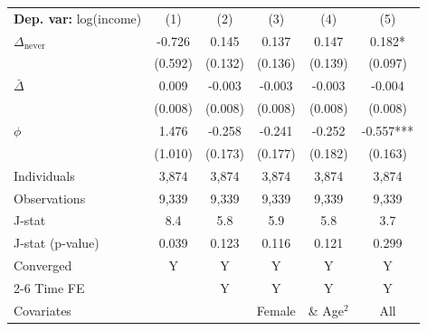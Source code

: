 \begin{tabular}{l ccccc} \toprule  \textbf{Dep. var:}  log(income) 
                    &\multicolumn{1}{c}{(1)}   &\multicolumn{1}{c}{(2)}   &\multicolumn{1}{c}{(3)}   &\multicolumn{1}{c}{(4)}   &\multicolumn{1}{c}{(5)}   \\

\addlinespace
$\Delta_{\text{never}}$&      -0.726   &       0.145   &       0.137   &       0.147   &       0.182*  \\
                    &     (0.592)   &     (0.132)   &     (0.136)   &     (0.139)   &     (0.097)   \\

\addlinespace
$\bar{\Delta}$      &       0.009   &      -0.003   &      -0.003   &      -0.003   &      -0.004   \\
                    &     (0.008)   &     (0.008)   &     (0.008)   &     (0.008)   &     (0.008)   \\

\addlinespace
$\phi$              &       1.476   &      -0.258   &      -0.241   &      -0.252   &      -0.557***\\
                    &     (1.010)   &     (0.173)   &     (0.177)   &     (0.182)   &     (0.163)   \\
\addlinespace
Individuals         &       3,874   &       3,874   &       3,874   &       3,874   &       3,874   \\
Observations        &       9,339   &       9,339   &       9,339   &       9,339   &       9,339   \\
J-stat              &         8.4   &         5.8   &         5.9   &         5.8   &         3.7   \\
J-stat (p-value)    &       0.039   &       0.123   &       0.116   &       0.121   &       0.299   \\
Converged           &           Y   &           Y   &           Y   &           Y   &           Y   \\
\cmidrule{2-6} Time FE & & Y & Y & Y & Y \\ Covariates & & & Female & \& Age$^2$ & All \\ \bottomrule \end{tabular}
